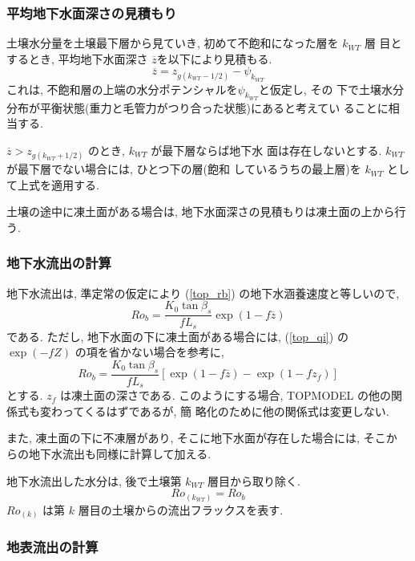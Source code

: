 \subsubsection{平均地下水面深さの見積もり}

土壌水分量を土壌最下層から見ていき, 初めて不飽和になった層を $k_{WT}$ 層
目とするとき, 平均地下水面深さ $\overline{z}$を以下により見積もる.
\begin{equation}
 \overline{z} = z_{g(k_{WT}-1/2)} - \psi_{k_{WT}}
\label{roff_table}
\end{equation}
これは, 不飽和層の上端の水分ポテンシャルを$\psi_{k_{WT}}$と仮定し, その
下で土壌水分分布が平衡状態(重力と毛管力がつり合った状態)にあると考えてい
ることに相当する.

$\overline{z} > z_{g(k_{WT}+1/2)}$ のとき, $k_{WT}$ が最下層ならば地下水
面は存在しないとする. $k_{WT}$ が最下層でない場合には, ひとつ下の層(飽和
しているうちの最上層)を $k_{WT}$ として上式を適用する.

土壌の途中に凍土面がある場合は, 地下水面深さの見積もりは凍土面の上から行
う.

\subsubsection{地下水流出の計算}

地下水流出は, 準定常の仮定により (\ref{top_rb}) の地下水涵養速度と等しいので,
\begin{equation}
 Ro_b = \frac{K_0 \tan\beta_s}{f L_s}\exp(1-f \overline{z})
\end{equation}
である.
ただし, 地下水面の下に凍土面がある場合には, (\ref{top_qi}) の
$\exp(-fZ)$ の項を省かない場合を参考に,
\begin{equation}
 Ro_b = \frac{K_0 \tan\beta_s}{f L_s}
  [ \exp(1-f \overline{z}) - \exp(1-f z_f) ]
\end{equation}
とする. $z_f$ は凍土面の深さである.
このようにする場合, TOPMODEL の他の関係式も変わってくるはずであるが, 簡
略化のために他の関係式は変更しない.

また, 凍土面の下に不凍層があり, そこに地下水面が存在した場合には, そこか
らの地下水流出も同様に計算して加える.

地下水流出した水分は, 後で土壌第 $k_{WT}$ 層目から取り除く.
\begin{equation}
 Ro_{(k_{WT})} = Ro_b
\end{equation}
$Ro_{(k)}$ は第 $k$ 層目の土壌からの流出フラックスを表す.


\subsubsection{地表流出の計算}

